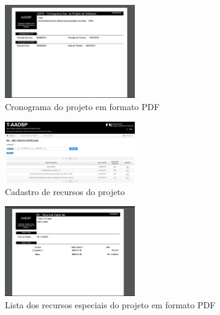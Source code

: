 \documentclass{acm_proc_article-sp}
\begin{document}
\begin{appendices}
\begin{figure}[h]
\centering %
\includegraphics[width=0.5\textwidth]{RF_cronograma_do_projeto_PDF.jpg} %
\caption{Cronograma do projeto em formato PDF}
\end{figure}

\begin{figure}[h]
\centering %
\includegraphics[width=0.5\textwidth]{RF_recursos_especiais_do_projeto.jpg} %
\caption{Cadastro de recursos do projeto}
\end{figure}

\begin{figure}[h]
\centering %
\includegraphics[width=0.5\textwidth]{RF_recursos_especiais_do_projeto_em_PDF.jpg} %
\caption{Lista dos recursos especiais do projeto em formato PDF}
\end{figure}





\end{appendices}
\end{document}
